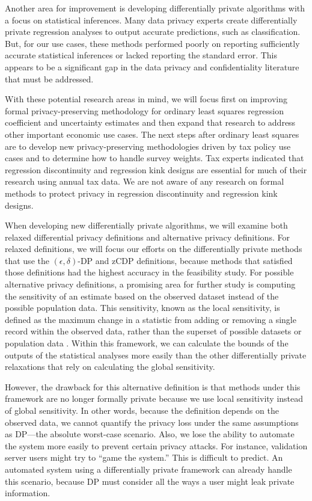 Another area for improvement is developing differentially private algorithms with a focus on statistical inferences. Many data privacy experts create differentially private regression analyses to output accurate predictions, such as classification. But, for our use cases, these methods performed poorly on reporting sufficiently accurate statistical inferences or lacked reporting the standard error. This appears to be a significant gap in the data privacy and confidentiality literature that must be addressed.

With these potential research areas in mind, we will focus first on improving formal privacy-preserving methodology for ordinary least squares regression coefficient and uncertainty estimates and then expand that research to address other important economic use cases. The next steps after ordinary least squares are to develop new privacy-preserving methodologies driven by tax policy use cases and to determine how to handle survey weights. Tax experts indicated that regression discontinuity and regression kink designs are essential for much of their research using annual tax data. We are not aware of any research on formal methods to protect privacy in regression discontinuity and regression kink designs.

When developing new differentially private algorithms, we will examine both relaxed differential privacy definitions and alternative privacy definitions. For relaxed definitions, we will focus our efforts on the differentially private methods that use the $(\epsilon,\delta)$-DP and zCDP definitions, because methods that satisfied those definitions had the highest accuracy in the feasibility study. For possible alternative privacy definitions, a promising area for further study is computing the sensitivity of an estimate based on the observed dataset instead of the possible population data. This sensitivity, known as the local sensitivity, is defined as the maximum change in a statistic from adding or removing a single record within the observed data, rather than the superset of possible datasets or population data \citep{nissim2007smooth}. Within this framework, we can calculate the bounds of the outputs of the statistical analyses more easily than the other differentially private relaxations that rely on calculating the global sensitivity.

However, the drawback for this alternative definition is that methods under this framework are no longer formally private because we use local sensitivity instead of global sensitivity. In other words, because the definition depends on the observed data, we cannot quantify the privacy loss under the same assumptions as DP---the absolute worst-case scenario. Also, we lose the ability to automate the system more easily to prevent certain privacy attacks. For instance, validation server users might try to ``game the system.'' This is difficult to predict. An automated system using a differentially private framework can already handle this scenario, because DP must consider all the ways a user might leak private information.

